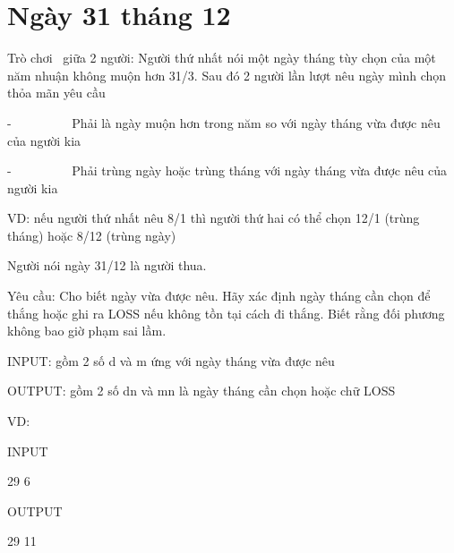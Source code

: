 



\section{   Ngày 31 tháng 12  }

   Trò chơi  giữa 2 người: Người thứ nhất nói một ngày tháng tùy chọn của một năm nhuận không muộn hơn 31/3. Sau đó 2 người lần lượt nêu ngày mình chọn thỏa mãn yêu cầu  

   -          Phải là ngày muộn hơn trong năm so với ngày tháng vừa được nêu của người kia  

   -          Phải trùng ngày hoặc trùng tháng với ngày tháng vừa được nêu của người kia  

   VD: nếu người thứ nhất nêu 8/1 thì người thứ hai có thể chọn 12/1 (trùng tháng) hoặc 8/12 (trùng ngày)  

   Người nói ngày 31/12 là người thua.  

   Yêu cầu: Cho biết ngày vừa được nêu. Hãy xác định ngày tháng cần chọn để thắng hoặc ghi ra LOSS nếu không tồn tại cách đi thắng. Biết rằng đối phương không bao giờ phạm sai lầm.  

   INPUT: gồm 2 số d và m ứng với ngày tháng vừa được nêu  

   OUTPUT: gồm 2 số dn và mn là ngày tháng cần chọn hoặc chữ LOSS  

   VD:  

   INPUT  

   29 6  

   OUTPUT  

   29 11  